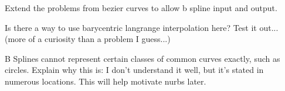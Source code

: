 \begin{problem}
Extend the problems from bezier curves to allow b spline input and output.
\end{problem}

\begin{problem}
Is there a way to use barycentric langrange interpolation here? Test it out... (more of a curiosity than a problem I guess...)
\end{problem}

\begin{problem}
B Splines cannot represent certain classes of common curves exactly, such as circles. Explain why this is: I don't understand it well, but it's stated in numerous locations. This will help motivate nurbs later.
\end{problem}
